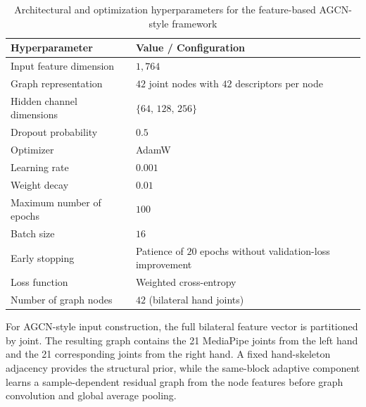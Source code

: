 \begin{table}[H]
    \centering
    \caption{Architectural and optimization hyperparameters for the feature-based AGCN-style framework}
    \label{tab:agcn_params}
    \small
    \setlength{\tabcolsep}{12pt}
    \begin{tabularx}{\linewidth}{>{\raggedright\arraybackslash}X >{\raggedright\arraybackslash}X}
        \hline
        Hyperparameter & Value / Configuration \\
        \hline
        Input feature dimension     & $1,764$ \\
        Graph representation        & $42$ joint nodes with $42$ descriptors per node \\
        Hidden channel dimensions   & $\{64,\,128,\,256\}$ \\
        Dropout probability         & $0.5$ \\
        Optimizer                   & AdamW \\
        Learning rate               & $0.001$ \\
        Weight decay                & $0.01$ \\
        Maximum number of epochs    & $100$ \\
        Batch size                  & $16$ \\
        Early stopping              & Patience of $20$ epochs without validation-loss improvement \\
        Loss function               & Weighted cross-entropy \\
        Number of graph nodes       & $42$ (bilateral hand joints) \\
        \hline
    \end{tabularx}
\end{table}

For AGCN-style input construction, the full bilateral feature vector is partitioned by joint. The resulting graph contains the 21 MediaPipe joints from the left hand and the 21 corresponding joints from the right hand. A fixed hand-skeleton adjacency provides the structural prior, while the same-block adaptive component learns a sample-dependent residual graph from the node features before graph convolution and global average pooling.

\setlength{\parskip}{10pt}
